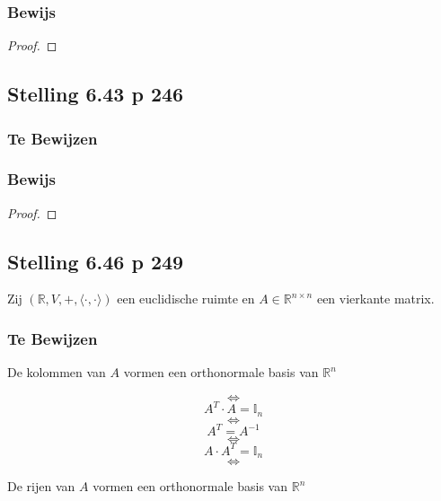 \documentclass[lineaire_algebra_oplossingen.tex]{subfiles}
\begin{document}
\subsubsection*{Bewijs}
\begin{proof}

\end{proof}

\subsection{Stelling 6.43 p 246}
\subsubsection*{Te Bewijzen}
\subsubsection*{Bewijs}
\begin{proof}

\end{proof}


\subsection{Stelling 6.46 p 249}
Zij $(\mathbb{R},V,+,\langle \cdot , \cdot \rangle)$ een euclidische ruimte en $A\in \mathbb{R}^{n\times n}$ een vierkante matrix.
\subsubsection*{Te Bewijzen}
\begin{center}
De kolommen van $A$ vormen een orthonormale basis van $\mathbb{R}^n$
\end{center}
\[\Leftrightarrow\]
\[A^T \cdot A = \mathbb{I}_n\]
\[\Leftrightarrow\]
\[A^T =A^{-1}\]
\[\Leftrightarrow\]
\[A \cdot A^T = \mathbb{I}_n\]
\[\Leftrightarrow\]
\begin{center}
De rijen van $A$ vormen een orthonormale basis van $\mathbb{R}^n$
\end{center}
\end{document}
